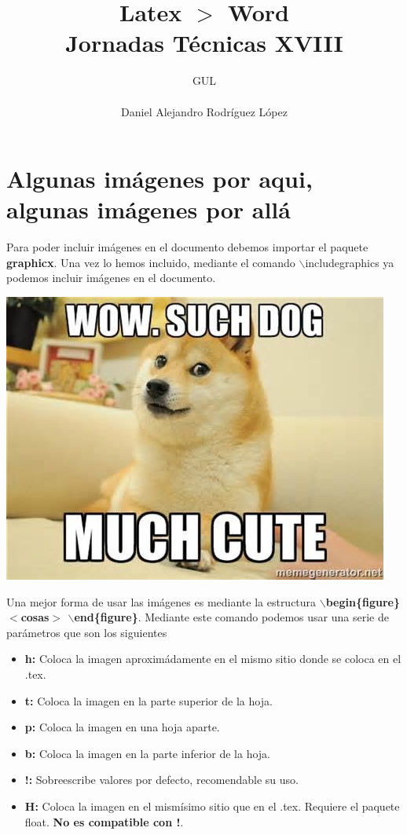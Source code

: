 \documentclass[10pt,a4paper,titlepage]{article} %
\title{ \textbf{ \Huge{Latex $>$ Word}} \\ Jornadas Técnicas XVIII}
\author{
		\begin{tabular}{l}
			\multicolumn{1}{l}{GUL} \\ \hline \\
			Daniel Alejandro Rodríguez López \\
		\end{tabular}
}
\begin{document}
\maketitle
\newpage

\section*{Algunas imágenes por aqui, algunas imágenes por allá}
	Para poder incluir imágenes en el documento debemos importar el paquete \textbf{graphicx}. Una vez lo hemos incluido, mediante el comando $\backslash$includegraphics ya podemos incluir imágenes en el documento.

	\begin{center}
		\includegraphics[scale=0.5]{images/imagen1}
	\end{center}

	Una mejor forma de usar las imágenes es mediante la estructura \textbf{$\backslash$begin\{figure\} $<$cosas$>$ $\backslash$end\{figure\}}. Mediante este comando podemos usar una serie de parámetros que son los siguientes
	\begin{itemize}
		\item \textbf{h:} Coloca la imagen aproximádamente en el mismo sitio donde se coloca en el .tex.
		\item \textbf{t:} Coloca la imagen en la parte superior de la hoja.
		\item \textbf{p:} Coloca la imagen en una hoja aparte.
		\item \textbf{b:} Coloca la imagen en la parte inferior de la hoja.
		\item \textbf{!:} Sobreescribe valores por defecto, recomendable su uso.
		\item \textbf{H:} Coloca la imagen en el mismísimo sitio que en el .tex. Requiere el paquete float. \textbf{No es compatible con !}.
	\end{itemize}
\end{document}
